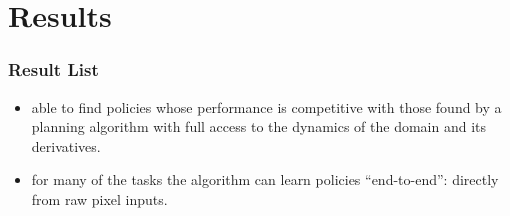 \section{Results}

\begin{frame}
\frametitle{Result List}

\begin{itemize}
  \item able to find policies whose performance is competitive with those found by a planning algorithm with full access to the dynamics of the domain and its derivatives.
  \item for many of the tasks the algorithm can learn policies “end-to-end”: directly from raw pixel inputs.
\end{itemize}

\end{frame}

